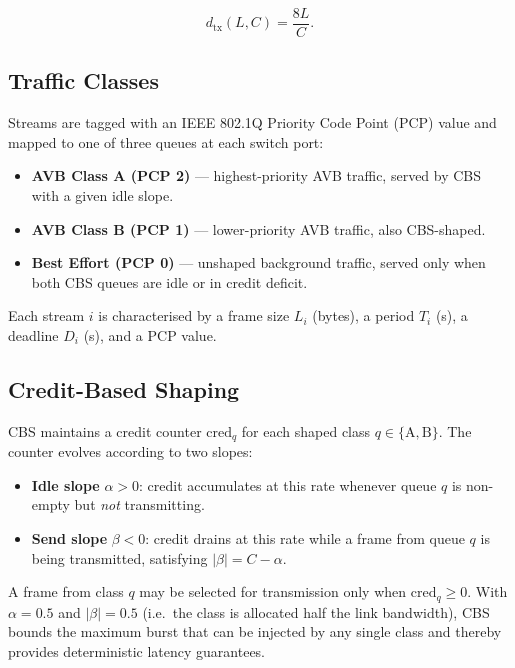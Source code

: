 \begin{equation}
    d_{\mathrm{tx}}(L, C) = \frac{8L}{C}.
    \label{eq:tx}
\end{equation}

\subsection{Traffic Classes}

Streams are tagged with an IEEE 802.1Q Priority Code Point (PCP) value and mapped to one of three queues at each switch port:

\begin{itemize}
    \item \textbf{AVB Class A (PCP 2)} — highest-priority AVB traffic, served by CBS with a given idle slope.
    \item \textbf{AVB Class B (PCP 1)} — lower-priority AVB traffic, also CBS-shaped.
    \item \textbf{Best Effort (PCP 0)} — unshaped background traffic, served only when both CBS queues are idle or in credit deficit.
\end{itemize}

Each stream $i$ is characterised by a frame size $L_i$ (bytes), a period $T_i$ (\textmu s), a deadline $D_i$ (\textmu s), and a PCP value.

\subsection{Credit-Based Shaping}

CBS maintains a credit counter $\mathrm{cred}_q$ for each shaped class $q \in \{\mathrm{A},\mathrm{B}\}$.  The counter evolves according to two slopes:

\begin{itemize}
    \item \textbf{Idle slope} $\alpha > 0$: credit accumulates at this rate whenever queue $q$ is non-empty but \emph{not} transmitting.
    \item \textbf{Send slope} $\beta < 0$: credit drains at this rate while a frame from queue $q$ is being transmitted, satisfying $|\beta| = C - \alpha$.
\end{itemize}

A frame from class $q$ may be selected for transmission only when $\mathrm{cred}_q \geq 0$.  With $\alpha = 0.5$ and $|\beta| = 0.5$ (i.e.\ the class is allocated half the link bandwidth), CBS bounds the maximum burst that can be injected by any single class and thereby provides deterministic latency guarantees.


